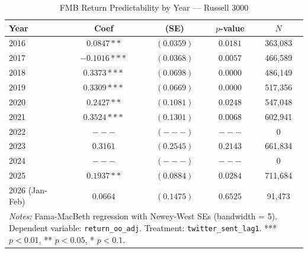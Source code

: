 \begin{table}[htbp]
\centering
\caption{FMB Return Predictability by Year --- Russell 3000}
\label{tab:russel_fmb_annual}
\begin{tabular}{lcccc}
\hline\hline
Year & Coef & (SE) & $p$-value & $N$ \\
\hline
  2016 & $0.0847**$ & $(0.0359)$ & $0.0181$ & 363,083 \\
  2017 & $-0.1016***$ & $(0.0368)$ & $0.0057$ & 466,589 \\
  2018 & $0.3373***$ & $(0.0698)$ & $0.0000$ & 486,149 \\
  2019 & $0.3309***$ & $(0.0669)$ & $0.0000$ & 517,356 \\
  2020 & $0.2427**$ & $(0.1081)$ & $0.0248$ & 547,048 \\
  2021 & $0.3524***$ & $(0.1301)$ & $0.0068$ & 602,941 \\
  2022 & $---$ & $(---)$ & $---$ & 0 \\
  2023 & $0.3161$ & $(0.2545)$ & $0.2143$ & 661,834 \\
  2024 & $---$ & $(---)$ & $---$ & 0 \\
  2025 & $0.1937**$ & $(0.0884)$ & $0.0284$ & 711,684 \\
  2026 (Jan-Feb) & $0.0664$ & $(0.1475)$ & $0.6525$ & 91,473 \\
\hline\hline
\multicolumn{5}{p{0.9\linewidth}}{\footnotesize \textit{Notes:} Fama-MacBeth regression with Newey-West SEs (bandwidth = 5). Dependent variable: \texttt{return_oo_adj}. Treatment: \texttt{twitter\_sent\_lag1}. *** $p<0.01$, ** $p<0.05$, * $p<0.1$.} \\
\end{tabular}
\end{table}